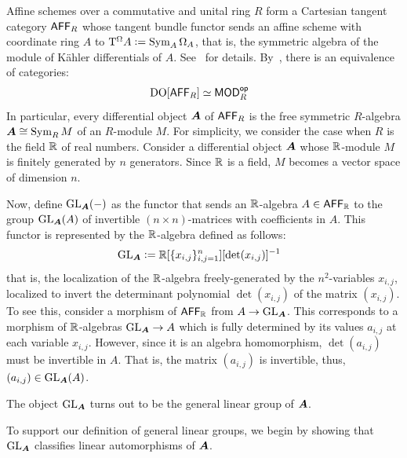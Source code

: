 \begin{example}
\label{example:GL-affine}
Affine schemes over a commutative and unital ring $R$ form a Cartesian tangent category $\Aff_R$ whose tangent bundle functor sends an affine scheme with coordinate ring $A$ to $\mathrm{T}^\Omega A\mathrel{\mathop:}=\operatorname{Sym}_A\Omega_A$, that is, the symmetric algebra of the module of K\"ahler differentials of $A$. See~\cite{cruttwell:algebraic-geometry} for details. By~\cite[Corollary~4.18 and Remark~4.20]{cruttwell:algebraic-geometry}, there is an equivalence of categories:
\begin{align*}
&\DO[\Aff_R]\simeq\Mod_R^\op
\end{align*}
In particular, every differential object ${\bm{A}}$ of $\Aff_R$ is the free symmetric $R$-algebra ${\bm{A}}\cong\operatorname{Sym}_RM$ of an $R$-module $M$. For simplicity, we consider the case when $R$ is the field $\mathbb{\bm{R}}$ of real numbers. Consider a differential object ${\bm{A}}$ whose $\mathbb{\bm{R}}$-module $M$ is finitely generated by $n$ generators. Since $\mathbb{\bm{R}}$ is a field, $M$ becomes a vector space of dimension $n$.

Now, define $\operatorname{GL}_{\bm{A}}(-)$ as the functor that sends an $\mathbb{\bm{R}}$-algebra $A\in\Aff_\Real$ to the group $\operatorname{GL}_{\bm{A}}(A)$ of invertible $(n\times n)$-matrices with coefficients in $A$. This functor is represented by the $\mathbb{\bm{R}}$-algebra defined as follows:
\begin{align*}
&\operatorname{GL}_{\bm{A}}\mathrel{\mathop:}=\mathbb{\bm{R}}[\{x_{i,j}\}_{i,j=1}^n][\det(x_{i,j})]^{-1}
\end{align*}
that is, the localization of the $\mathbb{\bm{R}}$-algebra freely-generated by the $n^2$-variables $x_{i,j}$, localized to invert the determinant polynomial $\det(x_{i,j})$ of the matrix $(x_{i,j})$. To see this, consider a morphism of $\Aff_\Real$ from $A\to\operatorname{GL}_{\bm{A}}$. This corresponds to a morphism of $\mathbb{\bm{R}}$-algebras $\operatorname{GL}_{\bm{A}}\to A$ which is fully determined by its values $a_{i,j}$ at each variable $x_{i,j}$. However, since it is an algebra homomorphism, $\det(a_{i,j})$ must be invertible in $A$. That is, the matrix $(a_{i,j})$ is invertible, thus, $(a_{i,j})\in\operatorname{GL}_{\bm{A}}(A)$.

The object $\operatorname{GL}_{\bm{A}}$ turns out to be the general linear group of ${\bm{A}}$.
\end{example}

To support our definition of general linear groups, we begin by showing that $\operatorname{GL}_{\bm{A}}$ classifies linear automorphisms of ${\bm{A}}$.


